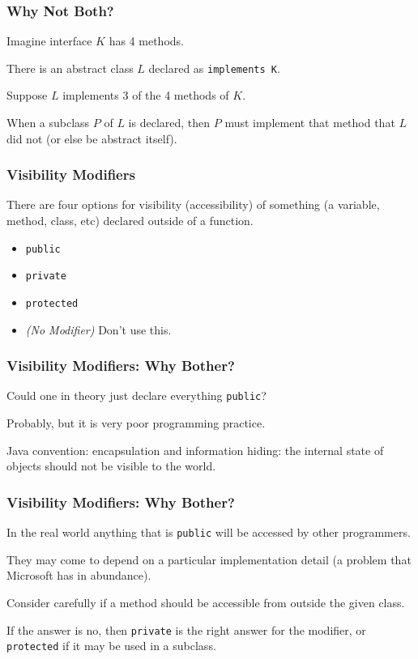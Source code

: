 \begin{frame}
\frametitle{Why Not Both?}
\begin{changemargin}{1cm}
Imagine interface $K$ has 4 methods. 

There is an abstract class $L$ declared as \texttt{implements K}. 

Suppose $L$ implements 3 of the 4 methods of $K$. 

When a subclass $P$ of $L$ is declared, then $P$ must implement that method that $L$ did not (or else be abstract itself).

\end{changemargin}
\end{frame}


\begin{frame}
\frametitle{Visibility Modifiers}
\begin{changemargin}{1cm}
There are four options for visibility (accessibility) of something (a variable, method, class, etc) declared outside of a function. 

\begin{itemize}
	\item \texttt{public}
	\item \texttt{private}
	\item \texttt{protected}
	\item \textit{(No Modifier)} Don't use this.
\end{itemize}

\end{changemargin}
\end{frame}

\begin{frame}
\frametitle{Visibility Modifiers: Why Bother?}
\begin{changemargin}{1cm}

Could one in theory just declare everything \texttt{public}? 

Probably, but it is very poor programming practice. 

Java convention: encapsulation and information hiding: the internal state of objects should not be visible to the world. 
\end{changemargin}
\end{frame}

\begin{frame}
\frametitle{Visibility Modifiers: Why Bother?}
\begin{changemargin}{1cm}
In the real world anything that is \texttt{public} will be accessed by other programmers. 

They may come to depend on a particular implementation detail (a problem that Microsoft has in abundance). 

Consider carefully if a method should be accessible from outside the given class.

If the answer is no, then \texttt{private} is the right answer for the modifier, or \texttt{protected} if it may be used in a subclass.
\end{changemargin}
\end{frame}



